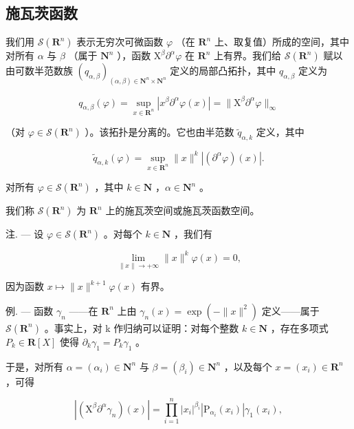 \subsection{施瓦茨函数}

我们用 \(\mathcal{S}(\mathbf{R}^{n})\) 表示无穷次可微函数 \(\varphi\) （在 \(\mathbf{R}^{n}\) 上、取复值）所成的空间，其中对所有 \(\alpha\) 与 \(\beta\) （属于 \(\mathbf{N}^{n}\) ），函数 \(\mathrm{X}^{\beta}\partial^{\alpha}\varphi\) 在 \(\mathbf{R}^{n}\) 上有界。我们给 \(\mathcal{S}(\mathbf{R}^{n})\) 赋以由可数半范数族 \((q_{\alpha,\beta})_{(\alpha,\beta)\in\mathbf{N}^{n}\times\mathbf{N}^{n}}\) 定义的局部凸拓扑，其中 \(q_{\alpha,\beta}\) 定义为

\[
q _ {\alpha , \beta} (\varphi) = \sup _ {x \in \mathbf {R} ^ {n}} | x ^ {\beta} \partial^ {\alpha} \varphi (x) | = \| \mathrm{X} ^ {\beta} \partial^ {\alpha} \varphi \| _ {\infty}
\]

（对 \(\varphi\in\mathcal{S}(\mathbf{R}^{n})\) ）。该拓扑是分离的。它也由半范数 \(\widetilde{q}_{\alpha,k}\) 定义，其中

\[
\widetilde {q} _ {\alpha , k} (\varphi) = \sup _ {x \in \mathbf {R} ^ {n}} \| x \| ^ {k} | (\partial^ {\alpha} \varphi) (x) |.
\]

对所有 \(\varphi\in\mathcal{S}(\mathbf{R}^{n})\) ，其中 \(k\in\mathbf{N}\) ，\(\alpha\in\mathbf{N}^{n}\) 。

我们称 \(\mathcal{S}(\mathbf{R}^{n})\) 为 \(\mathbf{R}^{n}\) 上的施瓦茨空间或施瓦茨函数空间。

注. --- 设 \(\varphi\in\mathcal{S}(\mathbf{R}^{n})\) 。对每个 \(k\in\mathbf{N}\) ，我们有

\[
\lim _ {\| x \| \to + \infty} \| x \| ^ {k} \varphi (x) = 0,
\]

因为函数 \(x \mapsto \|x\|^{k+1} \varphi(x)\) 有界。

例. --- 函数 \(\gamma_{n}\) ——在 \(\mathbf{R}^{n}\) 上由 \(\gamma_{n}(x)=\exp(-\|x\|^{2})\) 定义——属于 \(\mathcal{S}(\mathbf{R}^{n})\) 。事实上，对 k 作归纳可以证明：对每个整数 \(k\in \mathbf{N}\) ，存在多项式 \(P_{k}\in\mathbf{R}[X]\) 使得 \(\partial_{k}\gamma_{1}=P_{k}\gamma_{1}\) 。

于是，对所有 \(\alpha = (\alpha_{i})\in \mathbf{N}^{n}\) 与 \(\beta = (\beta_{i})\in \mathbf{N}^{n}\) ，以及每个 \(x = (x_{i})\in \mathbf{R}^{n}\) ，可得

\[
| (\mathrm{X} ^ {\beta} \partial^ {\alpha} \gamma_ {n}) (x) | = \prod_ {i = 1} ^ {n} | x _ {i} | ^ {\beta_ {i}} | \mathrm{P} _ {\alpha_ {i}} (x _ {i}) | \gamma_ {1} (x _ {i}),
\]

